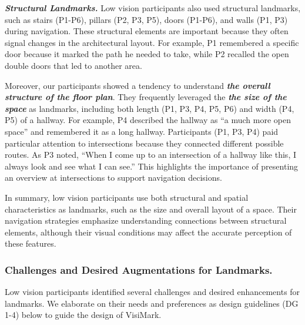 \textbf{\textit{Structural Landmarks.}}\label{Structural Landmarks}
 Low vision participants also used structural landmarks, such as stairs (P1-P6), pillars (P2, P3, P5), doors (P1-P6), and walls (P1, P3) during navigation. These structural elements are important because they often signal changes in the architectural layout. For example, P1 remembered a specific door because it marked the path he needed to take, while P2 recalled the open double doors that led to another area. %


Moreover, our participants showed a tendency to understand \textbf{\textit{the overall structure of the floor plan}}. They frequently leveraged the \textbf{\textit{the size of the space}} as landmarks, including both length (P1, P3, P4, P5, P6) and width (P4, P5) of a hallway. For example, P4 described the hallway as ``a much more open space'' and remembered it as a long hallway. Participants (P1, P3, P4) paid particular attention to intersections because they connected different possible routes. As P3 noted, ``When I come up to an intersection of a hallway like this, I always look and see what I can see.'' This highlights the importance of presenting an overview at intersections to support navigation decisions.


In summary, low vision participants use both structural and spatial characteristics as landmarks, such as the size and overall layout of a space. Their navigation strategies emphasize understanding connections between structural elements, although their visual conditions may affect the accurate perception of these features.

\subsubsection{Challenges and Desired Augmentations for Landmarks.} 

Low vision participants identified several challenges and desired enhancements for landmarks. We elaborate on their needs and preferences as design guidelines (DG 1-4) below to guide the design of VisiMark.


